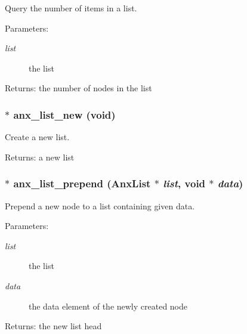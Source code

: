 Query the number of items in a list. 

\begin{Desc}
\item[Parameters:]
\begin{description}
\item[{\em list}]the list \end{description}
\end{Desc}
\begin{Desc}
\item[Returns:]the number of nodes in the list \end{Desc}
\subsubsection{$\ast$ anx\_\-list\_\-new (void)}\label{anx__list_8h_a1}


Create a new list. 

\begin{Desc}
\item[Returns:]a new list \end{Desc}
\subsubsection{$\ast$ anx\_\-list\_\-prepend ({\bf Anx\-List} $\ast$ {\em list}, void $\ast$ {\em data})}\label{anx__list_8h_a5}


Prepend a new node to a list containing given data. 

\begin{Desc}
\item[Parameters:]
\begin{description}
\item[{\em list}]the list \item[{\em data}]the data element of the newly created node \end{description}
\end{Desc}
\begin{Desc}
\item[Returns:]the new list head \end{Desc}
